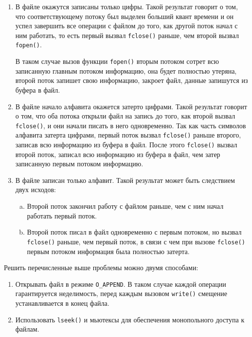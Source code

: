 \begin{enumerate}
    \item В файле окажутся записаны только цифры. Такой результат говорит о том, что соответствующему потоку был выделен больший квант времени и он успел завершить все операции с файлом до того, как другой поток начал с ним работать, то есть первый вызвал \texttt{fclose()} раньше, чем второй вызвал \texttt{fopen()}.
    
    В таком случае вызов функции \texttt{fopen()} вторым потоком сотрет всю записанную главным потоком информацию, она будет полностью утеряна, второй поток запишет свою информацию, закроет файл, данные запишутся из буфера в файл.

    \item В файле начало алфавита окажется затерто цифрами. Такой результат говорит о том, что оба потока открыли файл на запись до того, как второй вызвал \texttt{fclose()}, и они начали писать в него одновременно. Так как часть символов алфавита затерта цифрами, первый поток вызвал \texttt{fclose()} раньше второго, записав всю информацию из буфера в файл. После этого \texttt{fclose()} вызвал второй поток, записал всю информацию из буфера в файл, чем затер записанную первым потоком информацию.
    \item В файле записан только алфавит. Такой результат может быть следствием двух исходов:
    
    \begin{enumerate}[a)]
        \item Второй поток закончил работу с файлом раньше, чем с ним начал работать первый поток.
        \item Второй поток писал в файл одновременно с первым потоком, но вызвал \texttt{fclose()} раньше, чем первый поток, в связи с чем при вызове \texttt{fclose()} первым потоком информация была полностью затерта.
    \end{enumerate}
\end{enumerate}

Решить перечисленные выше проблемы можно двумя способами:

\begin{enumerate}
    \item Открывать файл в режиме \texttt{O\_APPEND}. В таком случае каждой операции гарантируется неделимость, перед каждым вызовом \texttt{write()} смещение устанавливается в конец файла.
    \item Использовать \texttt{lseek()} и мьютексы для обеспечения монопольного доступа к файлам.
\end{enumerate}

